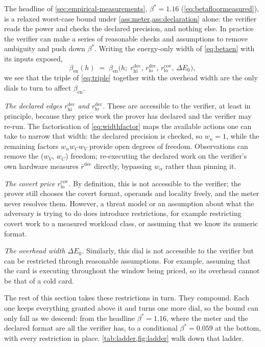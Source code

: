 \documentclass{article}
\theoremstyle{plain}
\theoremstyle{definition}
\theoremstyle{remark}
\begin{document}
The headline of \cref{sec:empirical-measurements}, $\beta^{*} = 1.16$
(\cref{eq:betafloormeasured}), is a relaxed worst-case bound under
\cref{ass:meter,ass:declaration} alone: the verifier reads the power and
checks the declared precision, and nothing else. In practice the verifier can
make a series of reasonable checks and assumptions to remove ambiguity and push
down $\beta^{*}$. Writing the
energy-only width of \cref{eq:betaen} with its inputs exposed,
\begin{equation}
	\beta_{\mathrm{en}}(h) \;=\;
	\beta_{\mathrm{en}}\bigl(h;\;
	r_{\mathrm{hi}}^{\mathrm{dec}},\,
	r_{\mathrm{lo}}^{\mathrm{dec}},\,
	r_{\mathrm{lo}}^{\mathrm{cov}},\,
	\Delta E_0\bigr),
	\label{eq:betadials}
\end{equation}
we see that the triple of \cref{eq:triple} together with the overhead width are the only
dials to turn to affect $\beta_{\mathrm{en}}$.

\emph{The declared edges $r_{\mathrm{hi}}^{\mathrm{dec}}$ and
$r_{\mathrm{lo}}^{\mathrm{dec}}$.} These are accessible to the verifier, at
least in principle, because they price work the prover has declared and the
verifier may re-run. The factorisation of \cref{eq:widthfactor} maps the available actions one can take to narrow that width: the declared precision is checked,
so $w_\kappa = 1$, while the remaining factors $w_\alpha w_C w_V$ provide open degrees of
freedom. Observations can remove the ($w_V$, $w_C$) freedom;
re-executing the declared work on the verifier's own hardware measures
$\bar r^{\mathrm{dec}}$ directly, bypassing $w_\alpha$ rather than pinning it.

\emph{The covert price $r_{\mathrm{lo}}^{\mathrm{cov}}$.} By definition, this is not accessible to the verifier; the prover still chooses the covert format, operands and locality freely,
and the meter never resolves them. However, a threat model or an assumption about what the
adversary is trying to do does introduce restrictions, for example
restricting covert work to a measured workload class, or assuming that we know
its numeric format.

\emph{The overhead width $\Delta E_0$.} Similarly, this dial is not
accessible to the verifier but can be restricted through reasonable
assumptions. For example, assuming that the card is executing throughout the
window being priced, so its overhead cannot be that of a cold card.

The rest of this section takes these restrictions in turn. They compound. Each
one keeps everything granted above it and turns one more dial, so the bound can
only fall as we descend: from the headline $\beta^{*} = 1.16$, where the meter
and the declared format are all the verifier has, to a conditional
$\beta^{*} = 0.059$ at the bottom, with every restriction in place.
\cref{tab:ladder,fig:ladder} walk down that ladder.
\end{document}
